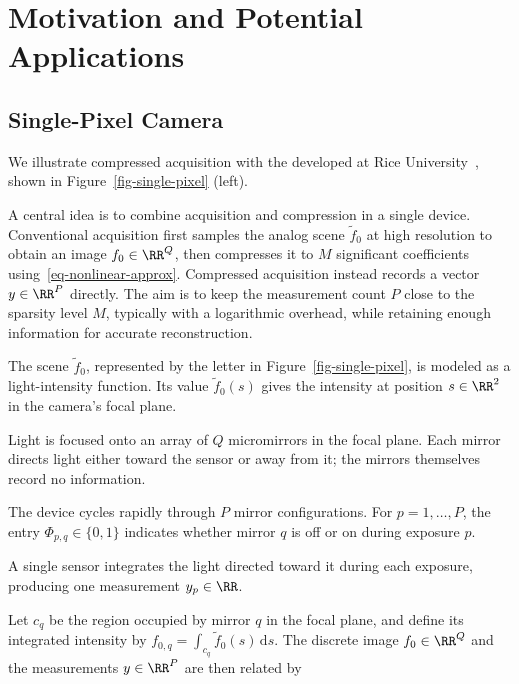 \section{Motivation and Potential Applications}


                                    
\subsection{Single-Pixel Camera}

We illustrate compressed acquisition with the  developed at Rice University~\cite{DuarteSinglePixel}, shown in Figure~\ref{fig-single-pixel} (left).
 
A central idea is to combine acquisition and compression in a single device. Conventional acquisition first samples the analog scene $\tilde f_0$ at high resolution to obtain an image $f_0\in\RR^Q$, then compresses it to $M$ significant coefficients using~\eqref{eq-nonlinear-approx}. Compressed acquisition instead records a vector $y\in\RR^P$ directly. The aim is to keep the measurement count $P$ close to the sparsity level $M$, typically with a logarithmic overhead, while retaining enough information for accurate reconstruction.

The scene $\tilde f_0$, represented by the letter  in Figure~\ref{fig-single-pixel}, is modeled as a light-intensity function. Its value $\tilde f_0(s)$ gives the intensity at position $s \in \RR^2$ in the camera's focal plane.
 
Light is focused onto an array of $Q$ micromirrors in the focal plane. Each mirror directs light either toward the sensor or away from it; the mirrors themselves record no information.
 
The device cycles rapidly through $P$ mirror configurations. For $p=1,\ldots,P$, the entry $\Phi_{p,q}\in\{0,1\}$ indicates whether mirror $q$ is off or on during exposure $p$.
 
A single sensor integrates the light directed toward it during each exposure, producing one measurement $y_p\in\RR$.
 
Let $c_q$ be the region occupied by mirror $q$ in the focal plane, and define its integrated intensity by $f_{0,q}=\int_{c_q}\tilde f_0(s)\,\mathrm{d}s$. The discrete image $f_0\in\RR^Q$ and the measurements $y\in\RR^P$ are then related by

